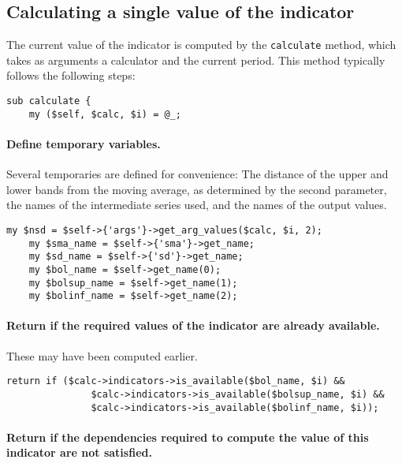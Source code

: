 \documentclass[11pt,twoside]{article}
\begin{document}
\subsection{Calculating a single value of the indicator}
The current value of the indicator is computed by the
\lstinline!calculate! method, which takes as arguments a
calculator and the current period. This method typically follows the
following steps:

\begin{lstlisting}[name=example]
sub calculate {
    my ($self, $calc, $i) = @_;
\end{lstlisting}

\paragraph{Define temporary variables.}

Several temporaries are defined for convenience: The distance of the
upper and lower bands from the moving average, as determined by the
second parameter, the names of the intermediate series used, and the
names of the output values.

\begin{lstlisting}[name=example]
    my $nsd = $self->{'args'}->get_arg_values($calc, $i, 2);
    my $sma_name = $self->{'sma'}->get_name;
    my $sd_name = $self->{'sd'}->get_name;
    my $bol_name = $self->get_name(0);
    my $bolsup_name = $self->get_name(1);
    my $bolinf_name = $self->get_name(2);

\end{lstlisting}

\paragraph{Return if the required values of the indicator are already available.} These may have been computed earlier.

\begin{lstlisting}[name=example]
    return if ($calc->indicators->is_available($bol_name, $i) &&
               $calc->indicators->is_available($bolsup_name, $i) &&
               $calc->indicators->is_available($bolinf_name, $i));
\end{lstlisting}

\paragraph{Return if the dependencies required to compute the value of this
indicator are not satisfied.}
\end{document}

